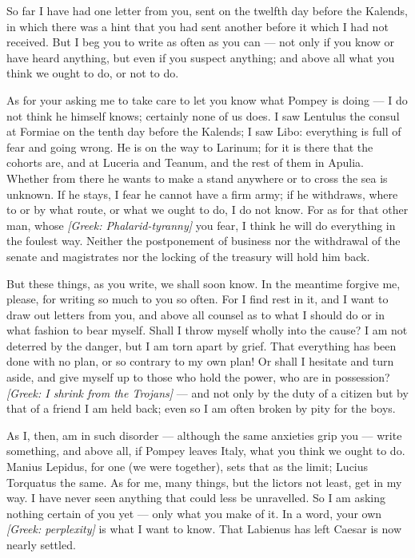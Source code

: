 

 So far I have had one letter from you, sent on the twelfth day before the Kalends, in which there was a hint that you had sent another before it which I had not received. But I beg you to write as often as you can --- not only if you know or have heard anything, but even if you suspect anything; and above all what you think we ought to do, or not to do.

 As for your asking me to take care to let you know what Pompey is doing --- I do not think he himself knows; certainly none of us does. I saw Lentulus the consul at Formiae on the tenth day before the Kalends; I saw Libo: everything is full of fear and going wrong. He is on the way to Larinum; for it is there that the cohorts are, and at Luceria and Teanum, and the rest of them in Apulia. Whether from there he wants to make a stand anywhere or to cross the sea is unknown. If he stays, I fear he cannot have a firm army; if he withdraws, where to or by what route, or what we ought to do, I do not know. For as for that other man, whose \textit{[Greek: Phalarid-tyranny]} you fear, I think he will do everything in the foulest way. Neither the postponement of business nor the withdrawal of the senate and magistrates nor the locking of the treasury will hold him back.

 But these things, as you write, we shall soon know. In the meantime forgive me, please, for writing so much to you so often. For I find rest in it, and I want to draw out letters from you, and above all counsel as to what I should do or in what fashion to bear myself. Shall I throw myself wholly into the cause? I am not deterred by the danger, but I am torn apart by grief. That everything has been done with no plan, or so contrary to my own plan! Or shall I hesitate and turn aside, and give myself up to those who hold the power, who are in possession? \textit{[Greek: I shrink from the Trojans]} --- and not only by the duty of a citizen but by that of a friend I am held back; even so I am often broken by pity for the boys.

 As I, then, am in such disorder --- although the same anxieties grip you --- write something, and above all, if Pompey leaves Italy, what you think we ought to do. Manius Lepidus, for one (we were together), sets that as the limit; Lucius Torquatus the same. As for me, many things, but the lictors not least, get in my way. I have never seen anything that could less be unravelled. So I am asking nothing certain of you yet --- only what you make of it. In a word, your own \textit{[Greek: perplexity]} is what I want to know. That Labienus has left Caesar is now nearly settled.

